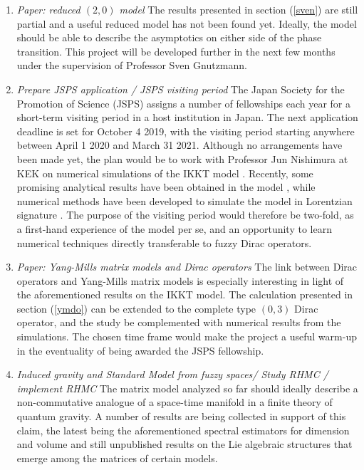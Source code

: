 \begin{enumerate}
\item \textit{Paper: reduced $(2,0)$ model}\newline
The results presented in section (\ref{sven}) are still partial and a useful reduced model has not been found yet. Ideally, the model should be able to describe the asymptotics on either side of the phase transition. This project will be developed further in the next few months under the supervision of Professor Sven Gnutzmann.
\item \textit{Prepare JSPS application / JSPS visiting period}\newline
The Japan Society for the Promotion of Science (JSPS) assigns a number of fellowships each year for a short-term visiting period in a host institution in Japan. The next application deadline is set for October 4 2019, with the visiting period starting anywhere between April 1 2020 and March 31 2021. Although no arrangements have been made yet, the plan would be to work with Professor Jun Nishimura at KEK on numerical simulations of the IKKT model \cite{ikkt}. Recently, some promising analytical results have been obtained in the model \cite{haroldCOSM}, while numerical methods have been developed to simulate the model in Lorentzian signature \cite{nishi}. The purpose of the visiting period would therefore be two-fold, as a first-hand experience of the model per se, and an opportunity to learn numerical techniques directly transferable to fuzzy Dirac operators. 
\item \textit{Paper: Yang-Mills matrix models and Dirac operators}\newline
The link between Dirac operators and Yang-Mills matrix models is especially interesting in light of the aforementioned results on the IKKT model. The calculation presented in section (\ref{ymdo}) can be extended to the complete type $(0,3)$ Dirac operator, and the study be complemented with numerical results from the simulations. The chosen time frame would make the project a useful warm-up in the eventuality of being awarded the JSPS fellowship. 
\item \textit{Induced gravity and Standard Model from fuzzy spaces/ Study RHMC / implement RHMC}\newline
The matrix model analyzed so far should ideally describe a non-commutative analogue of a space-time manifold in a finite theory of quantum gravity. A number of results are being collected in support of this claim, the latest being the aforementioned spectral estimators for dimension and volume \cite{barrdruceglaser} and still unpublished results on the Lie algebraic structures that emerge among the matrices of certain models.\newline

\end{enumerate}
